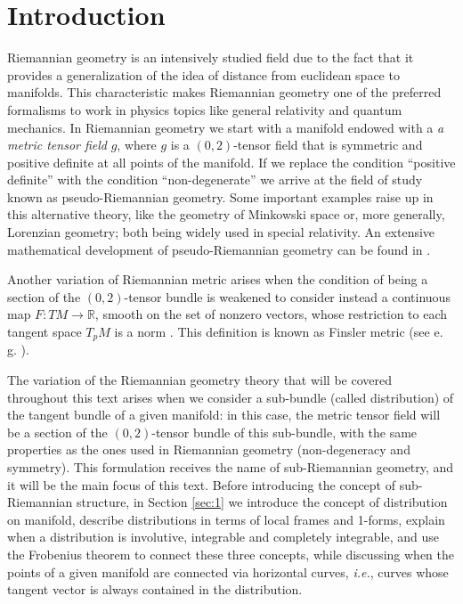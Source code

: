 \documentclass[12pt, letterpaper, reqno]{amsart}
\theoremstyle{definition}
\theoremstyle{plain}
\theoremstyle{remark}
\begin{document}
\section*{Introduction}
\label{sec:0}

Riemannian geometry is an intensively studied field due to the fact that it provides a generalization of the idea of distance from euclidean space to manifolds. 
This characteristic makes Riemannian geometry one of the preferred formalisms to work in physics topics like general relativity and quantum mechanics. 
In Riemannian geometry we start with a manifold endowed with a \emph{a metric tensor field} $g$, where $g$ is a $(0,2)$-tensor field that is symmetric and positive definite at all points of the manifold.  If we replace the condition ``positive definite'' with the condition ``non-degenerate'' we arrive at the field of study known as pseudo-Riemannian geometry. Some important examples raise up in this alternative theory, like the geometry of Minkowski space or, more generally, Lorenzian geometry; both being widely used in special relativity. 
An extensive mathematical development of pseudo-Riemannian geometry can be found in \cite{o1983semi}.

Another variation of Riemannian metric arises when the condition of being a section of the $(0,2)$-tensor bundle is weakened to consider instead a continuous map $F: TM \rightarrow \mathbb{R}$, smooth on the set of nonzero vectors, whose restriction to each tangent space $T_pM$ is a norm \cite[p.~47]{lee2018introduction}. This definition is known as Finsler metric (see e.\, g. \cite{bao2012introduction}).

The variation of  the Riemannian geometry theory that will be covered throughout this text arises when we consider a sub-bundle (called distribution) of the tangent bundle of a given manifold: in this case, the metric tensor field will be a section of the $ (0,2) $-tensor bundle of this sub-bundle, with the same properties as the ones used in Riemannian geometry (non-degeneracy and symmetry). This formulation receives the name of sub-Riemannian geometry, and it will be the main focus of this text. Before introducing the concept of sub-Riemannian structure, in Section \ref{sec:1} we introduce the concept of distribution on manifold, describe distributions in terms of local frames and 1-forms, explain when a distribution is involutive, integrable and completely integrable, and use the Frobenius theorem to connect these three concepts, while discussing when the points of a given manifold are connected via horizontal curves, \textit{i.e.}, curves whose tangent vector is always contained in the distribution.
\end{document}
